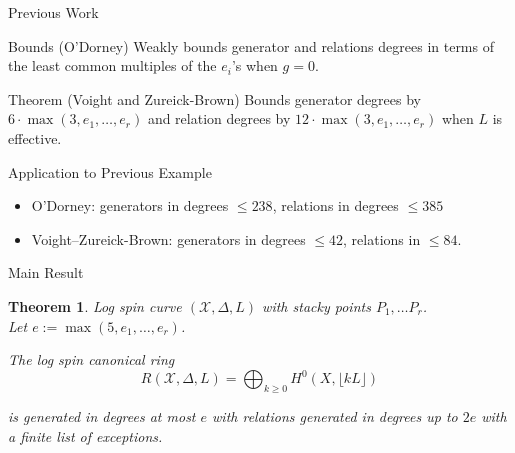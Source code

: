 \documentclass{beamer}
\newtheorem{thm}{Theorem}
\theoremstyle{remark}
\newcommand \sx{{\mathscr X}}
\newcommand{\halfcan}{L}
\begin{document}

\begin{frame}{Previous Work}
\begin{block}{Bounds (O'Dorney)}
Weakly bounds generator and relations degrees in terms of
the least common multiples of the $e_i$'s when $g = 0$.
\end{block}

\begin{block}{Theorem (Voight and Zureick-Brown)}
Bounds generator degrees by $6
\cdot \max(3, e_1, \ldots, e_r)$ and relation degrees by $12 \cdot \max
(3, e_1, \ldots, e_ r)$ when $\halfcan$ is effective.
\end{block}

\begin{block}{Application to Previous Example}
\begin{itemize}
\item O'Dorney: generators in degrees $\leq 238$, relations in degrees $\leq 385$
\item Voight--Zureick-Brown: generators in degrees $\leq 42$, relations in $\leq 84$.
\end{itemize}
\end{block}

\end{frame}


\begin{frame}{Main Result}
\begin{thm}
\label{thm:main}
Log spin curve $(\sx, \Delta, \halfcan)$ with stacky points $P_1, \ldots P_r$. \\
Let $e := \max(5, e_1, \ldots, e_r)$.

The log spin canonical ring 
\[
	R(\sx, \Delta, \halfcan) = \bigoplus_{k \geq 0} H^0(X, \lfloor k \halfcan \rfloor)
\]

\noindent
is generated in degrees at most $e$ with relations generated in
degrees up to $2e$ with a finite list of exceptions.
\end{thm}
\end{frame}

\end{document}
